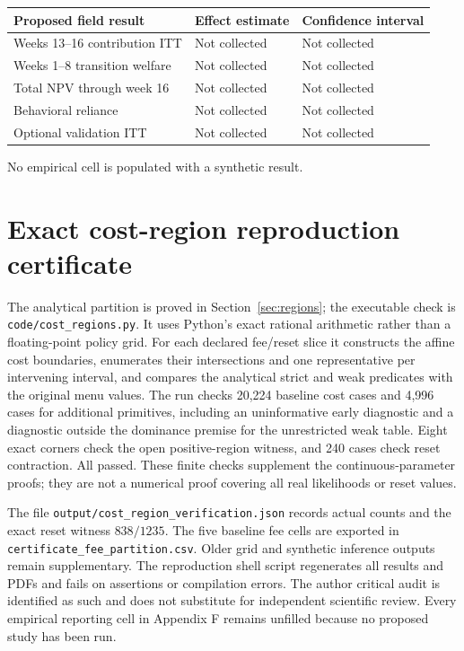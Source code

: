 \documentclass[11pt]{article}
\begin{document}
\normalsize
\begin{center}
\begin{tabular}{p{.40\linewidth}p{.22\linewidth}p{.22\linewidth}}
\toprule Proposed field result & Effect estimate & Confidence interval\\\midrule
Weeks 13--16 contribution ITT & Not collected & Not collected\\
Weeks 1--8 transition welfare & Not collected & Not collected\\
Total NPV through week 16 & Not collected & Not collected\\
Behavioral reliance & Not collected & Not collected\\
Optional validation ITT & Not collected & Not collected\\\bottomrule
\end{tabular}
\end{center}
No empirical cell is populated with a synthetic result.

\section{Exact cost-region reproduction certificate}\label{app:costcertificate}
The analytical partition is proved in Section~\ref{sec:regions}; the executable check is \texttt{code/cost\_regions.py}. It uses Python's exact rational arithmetic rather than a floating-point policy grid. For each declared fee/reset slice it constructs the affine cost boundaries, enumerates their intersections and one representative per intervening interval, and compares the analytical strict and weak predicates with the original menu values. The run checks 20,224 baseline cost cases and 4,996 cases for additional primitives, including an uninformative early diagnostic and a diagnostic outside the dominance premise for the unrestricted weak table. Eight exact corners check the open positive-region witness, and 240 cases check reset contraction. All passed. These finite checks supplement the continuous-parameter proofs; they are not a numerical proof covering all real likelihoods or reset values.

The file \texttt{output/cost\_region\_verification.json} records actual counts and the exact reset witness $838/1235$. The five baseline fee cells are exported in \texttt{certificate\_fee\_partition.csv}. Older grid and synthetic inference outputs remain supplementary. The reproduction shell script regenerates all results and PDFs and fails on assertions or compilation errors. The author critical audit is identified as such and does not substitute for independent scientific review. Every empirical reporting cell in Appendix F remains unfilled because no proposed study has been run.
\end{document}
